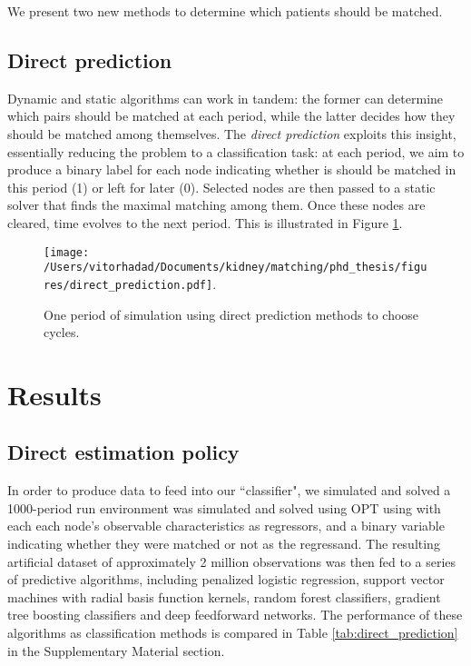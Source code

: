 \documentclass[format=acmsmall, review=false]{acmart}
\begin{document}
We present two new methods to determine which patients should be matched.

\subsection{Direct prediction} \label{subsec:direct_prediction}

Dynamic and static algorithms can work in tandem: the former can determine which pairs should be matched at each period, while the latter decides how they should be matched among themselves. The \emph{direct prediction} exploits this insight, essentially reducing the problem to a classification task: at each period, we aim to produce a binary label for each node indicating whether is should be matched in this period (1) or left for later (0). Selected nodes are then passed to a static solver that finds the maximal matching among them. Once these nodes are cleared, time evolves to the next period. This is illustrated in Figure \ref{fig:direct_prediction}.

\begin{figure}[H]
\centering
\texttt{[image: /Users/vitorhadad/Documents/kidney/matching/phd\_thesis/figures/direct\_prediction.pdf]}.
\caption{One period of simulation using direct prediction methods to choose cycles.}
\label{fig:direct_prediction}
\end{figure}


\section{Results}

\subsection{Direct estimation policy}

In order to produce data to feed into our ``classifier", we simulated and solved a 1000-period run environment was simulated and solved using OPT using with each each node's observable characteristics as regressors, and a binary variable indicating whether they were matched or not as the regressand. The resulting artificial dataset of approximately 2 million observations was then fed to a series of predictive algorithms, including penalized logistic regression\citep{wu2009genome}, support vector machines with radial basis function kernels\citep{cortes1995support}, random forest classifiers\citep{breiman2001random}, gradient tree boosting classifiers\citep{friedman2001greedy} and deep feedforward networks\citep{goodfellow2016deep}. The performance of these algorithms as classification methods is compared in Table \ref{tab:direct_prediction} in the Supplementary Material section.
\end{document}
